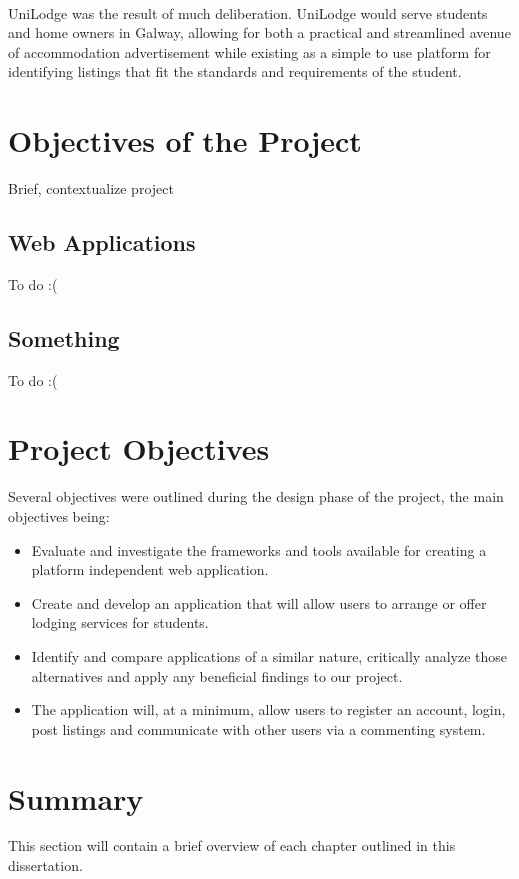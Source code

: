 \paragraph{}
UniLodge was the result of much deliberation. UniLodge would serve students and home owners in Galway, allowing for both a practical and streamlined avenue of accommodation advertisement while existing as a simple to use platform for identifying listings that fit the standards and requirements of the student. 

\section{Objectives of the Project}
Brief, contextualize project
\subsection{Web Applications}
To do :(
\subsection{Something}
To do :(

\section{Project Objectives}
Several objectives were outlined during the design phase of the project, the main objectives being:

\begin{itemize}
    \item Evaluate and investigate the frameworks and tools available for creating a platform independent web application.
    \item Create and develop an application that will allow users to arrange or offer lodging services for students.
    \item Identify and compare applications of a similar nature, critically analyze those alternatives and apply any beneficial findings to our project.
    \item The application will, at a minimum, allow users to register an account, login, post listings and communicate with other users via a commenting system.
\end{itemize}

\section{Summary}
This section will contain a brief overview of each chapter outlined in this dissertation.

